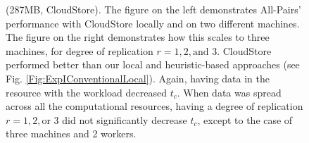 \documentclass{rspublic}
\newcommand{\fixme}[1]{ { \bf{ ***FIXME: #1
}} } \newcommand{\jhanote}[1]{ {\textcolor{red} { ***Jha: #1 }}}
\newcommand{\micnote}[1]{ {\textcolor{blue} { ***Michael: #1 }}}
\newcommand{\betynote}[1]{ {\textcolor{orange} { ***Bety: #1 }}}
\newcommand{\jhanote}[1]{} \newcommand{\micnote}[1]{}\newcommand{\betynote}[1]{} \newcommand{\fixme}[1]{}
\begin{document}
\begin{figure}
\begin{center}
\caption{(287MB,  CloudStore).
The figure on the left demonstrates All-Pairs' performance
with CloudStore locally and on two different machines. The figure on the
right demonstrates how this scales to three machines, for degree of
replication $r=1,2,\mbox{and } 3$. CloudStore performed better than our
local and heuristic-based approaches (see Fig.
\ref{Fig:ExpIConventionalLocal}). Again,
having data in the resource with the workload decreased $t_c$. When data
was spread across all the computational resources, having a degree of
replication $r = 1, 2, \mbox{or } 3$ did not significantly decrease
$t_c$, except to the case of three machines and 2 workers.}
\label{Fig:experiment3}
\end{center}
\vspace{-0.3cm}
\end{figure}
\end{document}
